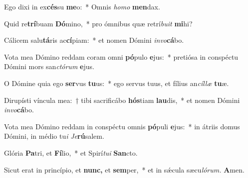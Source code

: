 \item Ego dixi in ex\textbf{cés}su \textbf{me}o:~* Omnis \textit{homo} \textbf{men}dax.
\item Quid re\textbf{trí}buam \textbf{Dó}mino,~* pro ómnibus quæ retrí\textit{buit} \textbf{mi}hi?
\item Cálicem salu\textbf{tá}ris ac\textbf{cí}piam:~* et nomen Dómini \textit{invo}\textbf{cá}bo.
\item Vota mea Dómino reddam coram omni \textbf{pó}pulo \textbf{e}jus:~* pretiósa in conspéctu Dómini mors san\textit{ctórum} \textbf{e}jus.
\item O Dómine quia ego \textbf{ser}vus \textbf{tu}us:~* ego servus tuus, et fílius an\textit{cíllæ} \textbf{tu}æ.
\item Dirupísti víncula mea:~† tibi sacrificábo \textbf{hós}tiam \textbf{lau}dis,~* et nomen Dómini \textit{invo}\textbf{cá}bo.
\item Vota mea Dómino reddam in conspéctu omnis \textbf{pó}puli \textbf{e}jus:~* in átriis domus Dómini, in médio tu\textit{i} \textit{Je}\textbf{rú}salem.
\item Glória \textbf{Pa}tri, et \textbf{Fí}lio,~* et Spirí\tinyhspace\textit{tui} \textbf{San}cto.
\item Sicut erat in princípio, et \textbf{nunc,} et \textbf{sem}per,~* et in sǽcula sæcu\tinyhspace\textit{lórum.} \textbf{A}men.